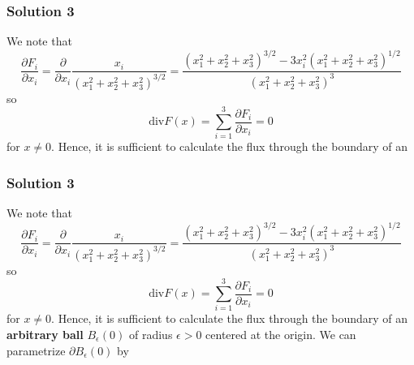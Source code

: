 \documentclass[10pt, t, allowdisplaybreaks]{beamer}
\begin{document}
\begin{frame}
    \frametitle{Solution 3}
    \par We note that 
    \begin{equation*}
        \frac{\partial F_i}{\partial x_i} = \frac{\partial }{\partial x_i}\frac{x_i}{(x_1^2+x_2^2+x_3^2)^{3/2}} = \frac{(x_1^2+x_2^2+x_3^2)^{3/2} - 3x_i^2(x_1^2+x_2^2+x_3^2)^{1/2}}{(x_1^2+x_2^2+x_3^2)^{3}}
    \end{equation*}
    so 
    \begin{equation*}
        \text{div}F(x) = \sum^3_{i = 1}\frac{\partial F_i}{\partial x_i} = 0
    \end{equation*}
    for $x\neq 0$. Hence, it is sufficient to calculate the flux through the boundary of an 
\end{frame}
\begin{frame}
    \frametitle{Solution 3}
    \par We note that 
    \begin{equation*}
        \frac{\partial F_i}{\partial x_i} = \frac{\partial }{\partial x_i}\frac{x_i}{(x_1^2+x_2^2+x_3^2)^{3/2}} = \frac{(x_1^2+x_2^2+x_3^2)^{3/2} - 3x_i^2(x_1^2+x_2^2+x_3^2)^{1/2}}{(x_1^2+x_2^2+x_3^2)^{3}}
    \end{equation*}
    so 
    \begin{equation*}
        \text{div}F(x) = \sum^3_{i = 1}\frac{\partial F_i}{\partial x_i} = 0
    \end{equation*}
    for $x\neq 0$. Hence, it is sufficient to calculate the flux through the boundary of an \textbf{arbitrary ball} $B_\epsilon(0)$ of radius $\epsilon>0$
    centered at the origin. We can parametrize $\partial B_\epsilon(0)$ by 
\end{frame}
\end{document}
